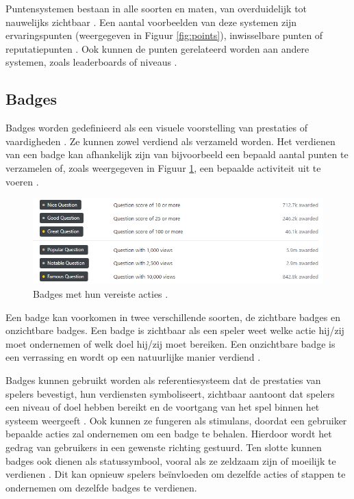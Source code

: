Puntensystemen bestaan in alle soorten en maten, van overduidelijk tot nauwelijks zichtbaar \autocite{Zichermann2011}. Een aantal voorbeelden van deze systemen zijn ervaringspunten (weergegeven in Figuur \ref{fig:points}), inwisselbare punten of reputatiepunten \autocite{Sailer2016}. Ook kunnen de punten gerelateerd worden aan andere systemen, zoals leaderboards of niveaus \autocite{Costa2019}.

\subsection{Badges}

Badges worden gedefinieerd als een visuele voorstelling van prestaties of vaardigheden \autocite{Costa2019}. Ze kunnen zowel verdiend als verzameld worden. Het verdienen van een badge kan afhankelijk zijn van bijvoorbeeld een bepaald aantal punten te verzamelen of, zoals weergegeven in Figuur \ref{fig:badges}, een bepaalde activiteit uit te voeren \autocite{Sailer2016}.

\begin{figure}
    \includegraphics[width=\linewidth]{Badges.png}
    \caption{Badges met hun vereiste acties \autocite{Badges2021}.}
    \label{fig:badges}
\end{figure}

Een badge kan voorkomen in twee verschillende soorten, de zichtbare badges en onzichtbare badges. Een badge is zichtbaar als een speler weet welke actie hij/zij moet ondernemen of welk doel hij/zij moet bereiken. Een onzichtbare badge is een verrassing en wordt op een natuurlijke manier verdiend \autocite{Costa2019}.

Badges kunnen gebruikt worden als referentiesysteem dat de prestaties van spelers bevestigt, hun verdiensten symboliseert, zichtbaar aantoont dat spelers een niveau of doel hebben bereikt \autocite{Anderson2013} en de voortgang van het spel binnen het systeem weergeeft \autocite{Zichermann2011}. Ook kunnen ze fungeren als stimulans, doordat een gebruiker bepaalde acties zal ondernemen om een badge te behalen. Hierdoor wordt het gedrag van gebruikers in een gewenste richting gestuurd. Ten slotte kunnen badges ook dienen als statussymbool, vooral als ze zeldzaam zijn of moeilijk te verdienen \autocite{Sailer2016}. Dit kan opnieuw spelers beïnvloeden om dezelfde acties of stappen te ondernemen om dezelfde badges te verdienen.

